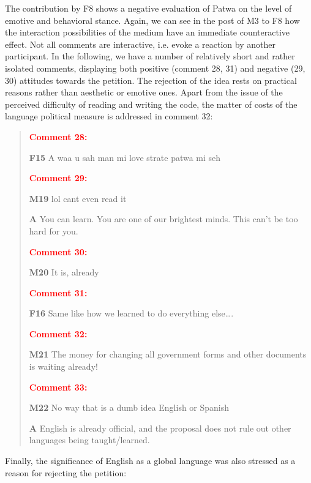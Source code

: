 \documentclass[output=paper,colorlinks,citecolor=brown]{langscibook}
\begin{document}
The contribution by F8 shows a negative evaluation of Patwa on the level of emotive and behavioral stance. Again, we can see in the post of M3 to F8 how the interaction possibilities of the medium have an immediate counteractive effect. Not all comments are interactive, i.e. evoke a reaction by another participant. In the following, we have a number of relatively short and rather isolated comments, displaying both positive (comment 28, 31) and negative (29, 30) attitudes towards the petition. The rejection of the idea rests on practical reasons rather than aesthetic or emotive ones. Apart from the issue of the perceived difficulty of reading and writing the code, the matter of costs of the language political measure is addressed in comment 32:
\begin{quote}
\noindent\textcolor[HTML]{FF0000}{\textbf{Comment 28:}}

\noindent\textbf{F15} A waa u sah man mi love strate patwa mi seh

\noindent\textcolor[HTML]{FF0000}{\textbf{Comment 29:}}

\noindent\textbf{M19} lol cant even read it

\textbf{A} You can learn. You are one of our brightest minds. This can’t be too hard for you.

\noindent\textcolor[HTML]{FF0000}{\textbf{Comment 30:}}

\noindent\textbf{M20} It is, already

\noindent\textcolor[HTML]{FF0000}{\textbf{Comment 31:}}

\noindent\textbf{F16} Same like how we learned to do everything else….

\noindent\textcolor[HTML]{FF0000}{\textbf{Comment 32:}}

\noindent\textbf{M21} The money for changing all government forms and other documents is waiting already!

\noindent\textcolor[HTML]{FF0000}{\textbf{Comment 33:}}

\noindent\textbf{M22} No way that is a dumb idea English or Spanish

\textbf{A} English is already official, and the proposal does not rule out other languages being taught/learned.
\end{quote}

Finally, the significance of English as a global language was also stressed as a reason for rejecting the petition:
\end{document}
